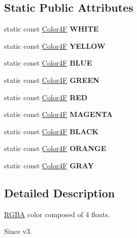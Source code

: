 \subsection*{Static Public Attributes}
\begin{DoxyCompactItemize}
\item 
\mbox{\label{structColor4F_a7e9cbba93820ce1b98d912212436f9d7}} 
static const \hyperlink{structColor4F}{Color4F} {\bfseries W\+H\+I\+TE}
\item 
\mbox{\label{structColor4F_aef52ee0336e6c46274f7a418eaf4bf7a}} 
static const \hyperlink{structColor4F}{Color4F} {\bfseries Y\+E\+L\+L\+OW}
\item 
\mbox{\label{structColor4F_ab16b93194a694c864498a5c9ed8f3f76}} 
static const \hyperlink{structColor4F}{Color4F} {\bfseries B\+L\+UE}
\item 
\mbox{\label{structColor4F_a71d9a5c385262542c40857075bf82bc4}} 
static const \hyperlink{structColor4F}{Color4F} {\bfseries G\+R\+E\+EN}
\item 
\mbox{\label{structColor4F_ab4a284e31111c963b9ae82c689449aad}} 
static const \hyperlink{structColor4F}{Color4F} {\bfseries R\+ED}
\item 
\mbox{\label{structColor4F_ae6737b892f23ec505f49eb49088c766e}} 
static const \hyperlink{structColor4F}{Color4F} {\bfseries M\+A\+G\+E\+N\+TA}
\item 
\mbox{\label{structColor4F_a1edd7a301e0393501a062b146ea654d0}} 
static const \hyperlink{structColor4F}{Color4F} {\bfseries B\+L\+A\+CK}
\item 
\mbox{\label{structColor4F_af6a491424fa05c33c708b0434a5b4746}} 
static const \hyperlink{structColor4F}{Color4F} {\bfseries O\+R\+A\+N\+GE}
\item 
\mbox{\label{structColor4F_aa6c47a320e917c55deaccf25da1f0484}} 
static const \hyperlink{structColor4F}{Color4F} {\bfseries G\+R\+AY}
\end{DoxyCompactItemize}


\subsection{Detailed Description}
\hyperlink{structRGBA}{R\+G\+BA} color composed of 4 floats. \begin{DoxySince}{Since}
v3. 
\end{DoxySince}


